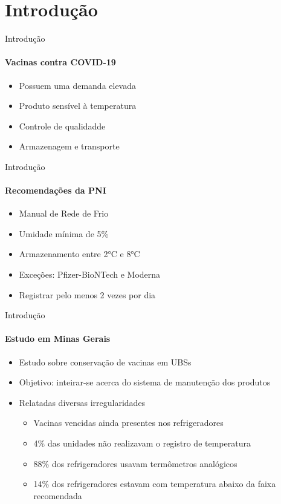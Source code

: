 \section{Introdução}
\begin{frame}{Introdução}
  \framesubtitle{Vacinas contra COVID-19}
  
  \begin{itemize}
    \item Possuem uma demanda elevada
    \item Produto sensível à temperatura
    \item Controle de qualidadde
    \item Armazenagem e transporte
  \end{itemize}
\end{frame}

\begin{frame}{Introdução}
  \framesubtitle{Recomendações da PNI}
  
  \begin{itemize}
    \item Manual de Rede de Frio
    \item Umidade mínima de \alert{5\%}
    \item Armazenamento entre \alert{2°C} e \alert{8°C}
    \item Exceções: Pfizer-BioNTech e Moderna
    \item Registrar pelo menos \alert{2} vezes por dia
  \end{itemize}
\end{frame}

\begin{frame}{Introdução}
  \framesubtitle{Estudo em Minas Gerais}
  
  \begin{itemize}
    \item Estudo sobre conservação de vacinas em UBSs
    \item Objetivo: inteirar-se acerca do sistema de manutenção dos produtos
    \item Relatadas diversas irregularidades
    \begin{itemize}
      \item Vacinas vencidas ainda presentes nos refrigeradores
      \item \alert{4\%} das unidades não realizavam o registro de temperatura
      \item \alert{88\%} dos refrigeradores usavam termômetros analógicos
      \item \alert{14\%} dos refrigeradores estavam com temperatura abaixo da faixa recomendada
    \end{itemize}
  \end{itemize}
\end{frame}
